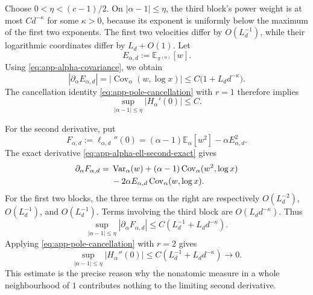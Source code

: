 \documentclass[aps,pra,11pt,onecolumn,nofootinbib,tightenlines]{revtex4-2}
\theoremstyle{definition}
\begin{document}
Choose $0<\eta<(c-1)/2$.  On $|\alpha-1|\leq\eta$, the third block's power weight is at most $Cd^{-\kappa}$ for some $\kappa>0$, because its exponent is uniformly below the maximum of the first two exponents.  The first two velocities differ by $O(L_d^{-1})$, while their logarithmic coordinates differ by $L_d+O(1)$.  Let
\begin{equation}
 E_{\alpha,d}:=\mathbb E_{\pi^{(\alpha)}}[w].
 \label{eq:app-Shannon-E}
\end{equation}
Using \eqref{eq:app-alpha-covariance}, we obtain
\begin{equation}
 |\partial_\alpha E_{\alpha,d}|
 =|\operatorname{Cov}_\alpha(w,\log x)|
 \leq C\bigl(1+L_dd^{-\kappa}\bigr).
 \label{eq:app-Shannon-E-alpha-bound}
\end{equation}
The cancellation identity \eqref{eq:app-pole-cancellation} with $r=1$ therefore implies
\begin{equation}
 \sup_{|\alpha-1|\leq\eta}|H_\alpha'(0)|\leq C.
 \label{eq:app-Shannon-first-uniform}
\end{equation}

For the second derivative, put
\begin{equation}
 F_{\alpha,d}:=\ell_{\alpha,d}''(0)
 =(\alpha-1)\mathbb E_\alpha[w^2]
 -\alpha E_{\alpha,d}^2.
 \label{eq:app-Shannon-F}
\end{equation}
The exact derivative \eqref{eq:app-alpha-ell-second-exact} gives
\begin{align}
 \partial_\alpha F_{\alpha,d}
 ={}&\operatorname{Var}_\alpha(w)
 +(\alpha-1)\operatorname{Cov}_\alpha(w^2,\log x)
 \notag\\
 &-2\alpha E_{\alpha,d}
 \operatorname{Cov}_\alpha(w,\log x).
 \label{eq:app-Shannon-F-alpha-exact}
\end{align}
For the first two blocks, the three terms on the right are respectively
$O(L_d^{-2})$, $O(L_d^{-1})$, and $O(L_d^{-1})$.  Terms involving the third block are $O(L_dd^{-\kappa})$.  Thus
\begin{equation}
 \sup_{|\alpha-1|\leq\eta}
 |\partial_\alpha F_{\alpha,d}|
 \leq C\left(L_d^{-1}+L_dd^{-\kappa}\right).
 \label{eq:app-Shannon-F-alpha-bound}
\end{equation}
Applying \eqref{eq:app-pole-cancellation} with $r=2$ gives
\begin{equation}
 \sup_{|\alpha-1|\leq\eta}|H_\alpha''(0)|
 \leq C\left(L_d^{-1}+L_dd^{-\kappa}\right)
 \longrightarrow0.
 \label{eq:app-Shannon-second-uniform}
\end{equation}
This estimate is the precise reason why the nonatomic measure in a whole neighbourhood of $1$ contributes nothing to the limiting second derivative.
\end{document}
